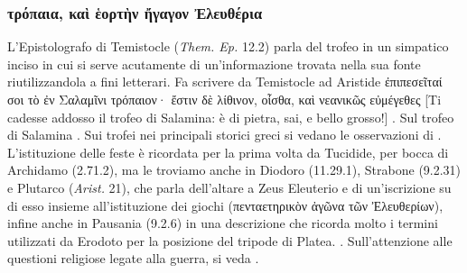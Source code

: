 {    \subsubsection{\textgreek{τρόπαια, καὶ ἑορτὴν ἤγαγον Ἐλευθέρια}}
    L'Epistolografo di Temistocle (\emph{Them. Ep.}  12.2) parla del trofeo in un simpatico inciso in cui si serve acutamente di un'informazione trovata nella sua fonte riutilizzandola a fini letterari. Fa scrivere da Temistocle ad Aristide \textgreek{ἐπιπεσεῖταί σοι τὸ ἐν Σαλαμῖνι τρόπαιον· ἔστιν δὲ λίθινον, οἶσθα, καὶ νεανικῶς εὐμέγεθες} [Ti cadesse addosso il trofeo di Salamina: è di pietra, sai, e bello grosso!]\label{bkm:themep122} \cite[53-56]{CulassoGastaldi1990}. Sul trofeo di Salamina \cite{Beschi2002}. Sui trofei nei principali storici greci si vedano le osservazioni di \cite{Hau2013}.
    L'istituzione delle feste è ricordata per la prima volta da Tucidide, per bocca di Archidamo (2.71.2), ma le troviamo anche in  Diodoro (11.29.1), Strabone (9.2.31) e Plutarco (\emph{Arist. }21), che parla dell'altare a Zeus Eleuterio e di un'iscrizione su di esso insieme all'istituzione dei giochi (\textgreek{πενταετηρικὸν ἀγῶνα τῶν Ἐλευθερίων}), infine anche in Pausania (9.2.6) in una descrizione che ricorda molto i termini utilizzati da Erodoto per la posizione del tripode di Platea. \cite{Liuzzo2012}. Sull'attenzione alle questioni religiose legate alla guerra, si veda \cite{Goodman1986}.
}

